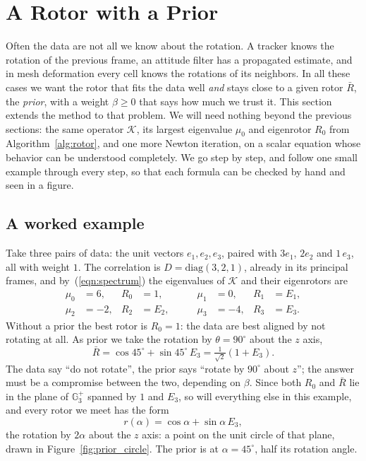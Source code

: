 \documentclass{birkjour}
\theoremstyle{definition}
\theoremstyle{remark}
\numberwithin{equation}{section}
\newcommand{\K}{\mathcal{K}}
\newcommand{\Ge}{\mathbb{G}}
\begin{document}
\section{A Rotor with a Prior}
\label{section:prior}

Often the data are not all we know about the rotation. A tracker knows the rotation of the previous frame, an attitude filter has a propagated estimate, and in mesh deformation every cell knows the rotations of its neighbors. In all these cases we want the rotor that fits the data well \emph{and} stays close to a given rotor $\bar R$, the \emph{prior}, with a weight $\beta \geq 0$ that says how much we trust it. This section extends the method to that problem. We will need nothing beyond the previous sections: the same operator $\K$, its largest eigenvalue $\mu_0$ and eigenrotor $R_0$ from Algorithm~\ref{alg:rotor}, and one more Newton iteration, on a scalar equation whose behavior can be understood completely. We go step by step, and follow one small example through every step, so that each formula can be checked by hand and seen in a figure.

\subsection{A worked example}
\label{section:prior_example}

Take three pairs of data: the unit vectors $e_1, e_2, e_3$, paired with $3 e_1$, $2 e_2$ and $1\, e_3$, all with weight $1$. The correlation is $D = \mathrm{diag}(3, 2, 1)$, already in its principal frames, and by~(\ref{eqn:spectrum}) the eigenvalues of $\K$ and their eigenrotors are
\begin{equation}
\label{eqn:prior_example_spectrum}
\begin{aligned}
\mu_0 &= 6, & R_0 &= 1, & \qquad \mu_1 &= 0, & R_1 &= E_1, \\
\mu_2 &= -2, & R_2 &= E_2, & \qquad \mu_3 &= -4, & R_3 &= E_3 .
\end{aligned}
\end{equation}
Without a prior the best rotor is $R_0 = 1$: the data are best aligned by not rotating at all. As prior we take the rotation by $\theta = 90^\circ$ about the $z$ axis,
\begin{equation}
\label{eqn:prior_example_prior}
\bar R = \cos 45^\circ + \sin 45^\circ\, E_3 = \tfrac{1}{\sqrt 2} (1 + E_3).
\end{equation}
The data say ``do not rotate'', the prior says ``rotate by $90^\circ$ about $z$''; the answer must be a compromise between the two, depending on $\beta$. Since both $R_0$ and $\bar R$ lie in the plane of $\Ge_3^+$ spanned by $1$ and $E_3$, so will everything else in this example, and every rotor we meet has the form
\begin{equation}
\label{eqn:prior_example_circle}
r(\alpha) = \cos\alpha + \sin\alpha\, E_3 ,
\end{equation}
the rotation by $2\alpha$ about the $z$ axis: a point on the unit circle of that plane, drawn in Figure~\ref{fig:prior_circle}. The prior is at $\alpha = 45^\circ$, half its rotation angle.
\end{document}
